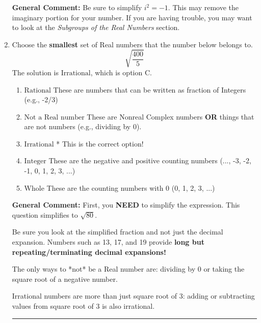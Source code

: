 \documentclass{extbook}[14pt]
\newcommand{\litem}[1]{\item #1

\rule{\textwidth}{0.4pt}}
\begin{document}
\begin{enumerate}
{\textbf{General Comment:} Be sure to simplify $i^2 = -1$. This may remove the imaginary portion for your number. If you are having trouble, you may want to look at the \textit{Subgroups of the Real Numbers} section.
}
\litem{
Choose the \textbf{smallest} set of Real numbers that the number below belongs to.
\[ \sqrt{\frac{400}{5}} \]
The solution is \( \text{Irrational} \), which is option C.\begin{enumerate}[label=\Alph*.]
\item \( \text{Rational} \)
These are numbers that can be written as fraction of Integers (e.g., -2/3)
\item \( \text{Not a Real number} \)
These are Nonreal Complex numbers \textbf{OR} things that are not numbers (e.g., dividing by 0).
\item \( \text{Irrational} \)
* This is the correct option!
\item \( \text{Integer} \)
These are the negative and positive counting numbers (..., -3, -2, -1, 0, 1, 2, 3, ...)
\item \( \text{Whole} \)
These are the counting numbers with 0 (0, 1, 2, 3, ...)
\end{enumerate}

\textbf{General Comment:} First, you \textbf{NEED} to simplify the expression. This question simplifies to $\sqrt{80}$. 
 
 Be sure you look at the simplified fraction and not just the decimal expansion. Numbers such as 13, 17, and 19 provide \textbf{long but repeating/terminating decimal expansions!} 
 
 The only ways to *not* be a Real number are: dividing by 0 or taking the square root of a negative number. 
 
 Irrational numbers are more than just square root of 3: adding or subtracting values from square root of 3 is also irrational.
}
\end{enumerate}
\end{document}
